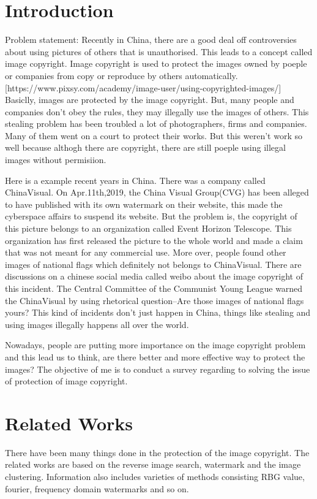 \section{Introduction}
Problem statement:
Recently in China, there are a good deal off controversies about using pictures of others that is unauthorised.
This leads to a concept called image copyright.
Image copyright is used to protect the images owned by poeple or companies from copy or reproduce by others automatically.[https://www.pixsy.com/academy/image-user/using-copyrighted-images/]
Basiclly, images are protected by the image copyright.
But, many people and companies don't obey the rules, they may illegally use the images of others.
This stealing problem has been troubled a lot of photographers, firms and companies.
Many of them went on a court to protect their works. 
But this weren't work so well because althogh there are copyright, there are still poeple using illegal images  without permisiion.

Here is a example recent years in China.
There was a company called ChinaVisual.
On Apr.11th,2019, the China Visual Group(CVG) has been alleged to have published with its own watermark on their website, 
this made the cyberspace affairs to suspend its website.
But the problem is, the copyright of this picture belongs to an organization called Event Horizon Telescope. 
This organization has first released the picture to the whole world and made a claim that was not meant for any commercial use.
More over, people found other images of national flags which definitely not belongs to ChinaVisual.
There are discussions on a chinese social media called weibo about the image copyright of this incident. 
The Central Committee of the Communist Young League warned the ChinaVisual by using rhetorical question--Are those images of national flags yours?
This kind of incidents don't just happen in China, things like stealing and using images illegally happens all over the world.

Nowadays, people are putting more importance on the image copyright problem and this lead us to think,
are there better and more effective way to protect the images?
The objective of me is to conduct a survey regarding to solving the issue of protection of image copyright.

\section{Related Works}
There have been many things done in the protection of the image copyright. 
The related works are based on the reverse image search, watermark and the image clustering.
Information also includes varieties of methods consisting RBG value, fourier, frequency domain watermarks and so on.

